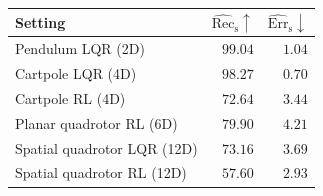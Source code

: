 \begin{tabular}{lrr}
\toprule
\textbf{Setting} & $\widehat{\mathrm{Rec}}_{\mathrm{s}}\uparrow$ & $\widehat{\mathrm{Err}}_{\mathrm{s}}\downarrow$ \\
\midrule
Pendulum LQR (2D) & $99.04$ & $1.04$ \\
Cartpole LQR (4D) & $98.27$ & $0.70$ \\
Cartpole RL (4D) & $72.64$ & $3.44$ \\
Planar quadrotor RL (6D) & $79.90$ & $4.21$ \\
Spatial quadrotor LQR (12D) & $73.16$ & $3.69$ \\
Spatial quadrotor RL (12D) & $57.60$ & $2.93$ \\
\bottomrule
\end{tabular}
